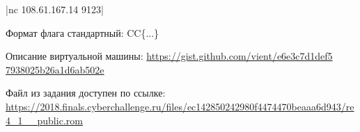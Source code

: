 
|nc 108.61.167.14 9123|

Формат флага стандартный: CC\{...\}

Описание виртуальной машины: \url{https://gist.github.com/vient/e6e3c7d1def5} \\ \url{7938025b26a1d6ab502e}

Файл из задания доступен по ссылке: \url{https://2018.finals.cyberchallenge.ru/files/ec142850242980f4474470beaaa6d943/re4_1__public.rom}
 
